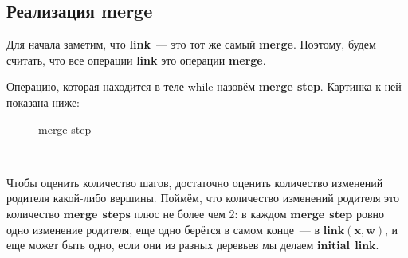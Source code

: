 \subsection{Реализация merge}
Для начала заметим, что \textbf{link}~--- это тот же самый \textbf{merge}. Поэтому, будем считать, что все операции \textbf{link} это операции \textbf{merge}.
\begin{algorithmic}[1]
            \Else
            \EndIf
        \EndIf
            \State \Return{$\varnothing$} 
        
        \Else 
            \EndIf
            \EndIf
             
                      
                     
                     
            \EndWhile
        \EndIf
    \EndProcedure
            
\end{algorithmic}

Операцию, которая находится в теле while назовём \textbf{merge step}. Картинка к ней показана ниже:
\begin{figure}[h]
\caption{merge step}
\label{merge step}
\end{figure}

$\quad$

Чтобы оценить количество шагов, достаточно оценить количество изменений родителя какой-либо вершины. Поймём, что количество изменений родителя это количество $\mathbf{merge\:\:steps}$ плюс не более чем 2: в каждом $\mathbf{merge\:\:step}$ ровно одно изменение родителя, еще одно берётся в самом конце~--- в $\mathbf{link(x, w)}$, и еще может быть одно, если они из разных деревьев мы делаем $\mathbf{initial\:\:link}$.

